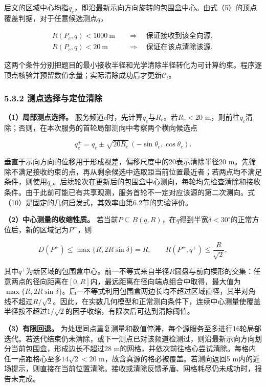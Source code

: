 \documentclass[UTF8,fontset=none,zihao=-4,a4paper]{ctexart}
\begin{document}
后文的区域中心均指\(q_c\)，即沿最新示向方向旋转的包围盒中心。由式（5）的顶点覆盖判据，对于任意候选测点\(q\)，

\[
\begin{aligned}
R(P_c,q)<1000\ \mathrm m&\quad\Longrightarrow\quad\text{保证接收到该全向源},\\
R(P_c,q)<20\ \mathrm m&\quad\Longrightarrow\quad\text{保证在该点清除该源}.
\end{aligned}
\]

这两个条件分别把题目的最小接收半径和光学清除半径转化为可计算约束。程序逐顶点核验并预留数值余量；实际清除成功后才更新\(\mathcal C_t\)。

\subsubsection{5.3.2 测点选择与定位清除}\label{ux6d4bux70b9ux9009ux62e9ux4e0eux5b9aux4f4dux6e05ux9664}

\textbf{（1）局部测点选择。} 服务频道\(c\)时，先计算\(q_c\)与\(R_c\)。若\(R_c<20\) m，则前往\(q_c\)清除；否则，在本次服务的首轮局部测向中考察两个横向候选点

\[
q_c^\pm=q_c\pm\sqrt{20R_c}\,(-\sin\theta_c,\cos\theta_c). \tag{10}
\]

垂直于示向方向的位移用于形成视差，偏移尺度中的20表示清除半径20 m。先筛除不满足接收约束的点，再从剩余候选中选取距当前位置最近者；若两点均不满足条件，则使用\(q_c\)。后续轮次在更新后的包围盒中心测向，每轮均先检查清除和接收条件。由于此前可能已有共享观测，服务首轮不一定对应该源的第二次测向。式（10）是固定的几何启发式，其效率由第6.2节的实验评价。

\textbf{（2）中心测量的收缩性质。} 若当前\(P\subseteq B(q,R)\)，在\(q\)得到半宽\(\delta<30^\circ\)的正常方位后，新的区域记为\(P^+\)，则

\[
D(P^+)\le\max\{R,2R\sin\delta\}=R,
\qquad R(P^+,q^+)\le\frac{R}{\sqrt2},
\]

其中\(q^+\)为新区域的包围盒中心。前一不等式来自半径\(R\)圆盘与前向楔形的交集：任意两点的径向距离在\([0,R]\)内，最远距离在径向端点组合中取得，最大值为\(\max\{R,2R\sin\delta\}\)。后一不等式利用包围盒两边长均不超过区域直径，其半对角线不超过\(R/\sqrt2\)。因此，在实数几何模型和正常测向条件下，连续中心测量使覆盖半径按不超过\(1/\sqrt2\)的因子收缩，有限次后可达到清除阈值。

\textbf{（3）有限回退。} 为处理同点重复测量和数值停滞，每个源服务至多进行16轮局部迭代。若迭代结束仍未清除，或下一测点已对该频道检测过，则沿最新示向方向划分当前包围盒，形成边长不超过28 m的网格，并依次前往格心尝试清除。每格内任一点距格心至多\(14\sqrt2<20\) m，故含真源的格必被覆盖。若测向返回5 m内的近场提示，则直接在当前位置清除。接收或清除反馈矛盾、网格耗尽仍未成功时，报告未完成。
\end{document}
